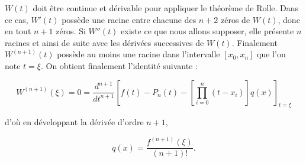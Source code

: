 \documentclass[a4paper, 10pt]{article}
\begin{document}
 $W(t)$ doit être continue et dérivable pour appliquer le théorème de Rolle. Dans ce cas,  $W'(t)$ possède une racine entre chacune des
 $n+2$ zéros de $W(t)$, donc en tout $n+1$ zéros. Si $W''(t)$ existe ce que nous allons supposer, elle présente $n$ racines et ainsi de suite
 avec les dérivées successives de $W(t)$. Finalement $W^{(n+1)}(t)$ possède au moins une racine dans l'intervalle $[x_0, x_n]$ que l'on 
 note $t=\xi$.
 On obtient finalement l'identité suivante :
 
\begin{equation}
W^{(n+1)}(\xi)= 0 = \frac{d^{n+1}}{dt^{n+1}}  \left[ f(t) - P_n(t) - \left[ \prod_{i=0}^n (t-x_i) \right] q(x) \right]_{t=\xi}
\label{aux2}
\end{equation}

d'où en développant la dérivée d'ordre $n+1$, 

\begin{equation}
q(x) = \frac{f^{(n+1)}(\xi)}{(n+1)! }   .
\label{aux3}
\end{equation}
\end{document}
